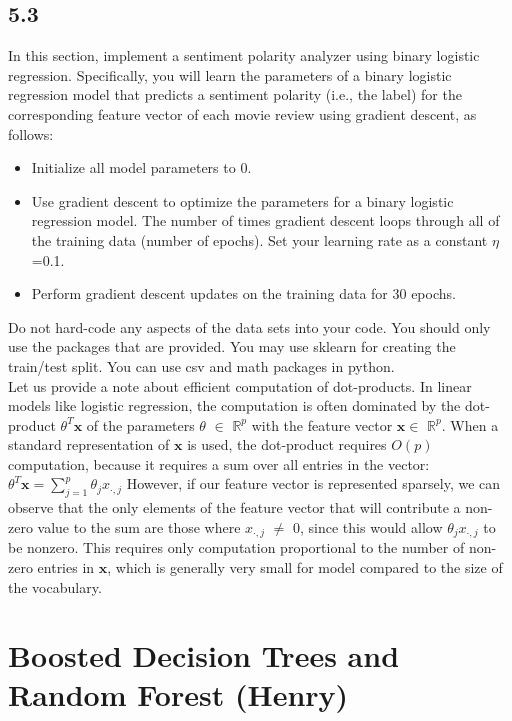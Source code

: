 \documentclass{exam}
\begin{document}
\subsection*{5.3}
In this section, implement a sentiment polarity analyzer using binary logistic regression. Specifically, you will learn the parameters of a binary logistic regression model that predicts a sentiment polarity (i.e., the label) for the corresponding feature vector of each movie review using gradient descent, as follows: 
\begin{itemize}
    \item Initialize all model parameters to 0.
    \item Use gradient descent to optimize the parameters for a binary logistic regression model. The number of times gradient descent loops through all of the training data (number of epochs). Set your learning rate as a constant $\eta$=0.1.
    \item Perform gradient descent updates on the training data for 30 epochs. 
\end{itemize}

Do not hard-code any aspects of the data sets into your code. You should only use the packages that are provided. You may use sklearn for creating the train/test split. You can use csv and math packages in python. \\

Let us provide a note about efficient computation of  dot-products.
In linear models like logistic regression, the computation is often dominated by the dot-product $\theta ^T\mathbf{x}$ of the parameters $\theta$ $\in$ $\mathbb{R}^p $ with the feature vector $\mathbf{x} \in$ $\mathbb{R}^p $. When a standard representation of $\mathbf{x}$ is used, the dot-product requires $O(p)$ computation, because it requires a sum over all entries in the vector:
$\theta ^T\mathbf{x} = \sum_{j=1}^{p} \theta_j x_{\cdot,j} $	
However, if our feature vector is represented sparsely, we can observe that the only elements of the feature vector that will contribute a non-zero value to the sum are those where $x_{\cdot,j}$ $\neq$ 0, since this would allow $\theta_j x_{\cdot,j}$ to be nonzero. This requires only computation proportional to the number of non-zero entries in $\mathbf{x}$, which is generally very small for model compared to the size of the vocabulary.

\section{Boosted Decision Trees and Random Forest (Henry)}
\end{document}
